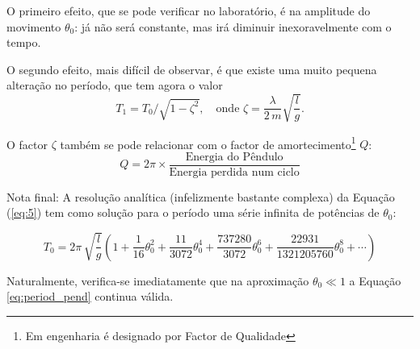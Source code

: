 \documentclass[a4paper,twoside,12pt]{article}      %
\begin{document}
O primeiro efeito, que se pode verificar no laboratório, é na amplitude do movimento $\theta_0$: já não será  constante, mas irá diminuir inexoravelmente com o tempo. 

O segundo efeito,  mais difícil de observar, é que existe uma muito pequena alteração no período, que tem agora o valor
\begin{equation}
T_1= T_0 / \sqrt{1 - \zeta^2}, \quad \text{onde }  \zeta = \frac{\lambda}{2\, m} \sqrt{\frac{l}{g}} .
\end{equation}



O factor  $ \zeta $ também se pode relacionar com o factor de amortecimento\footnote{Em engenharia é designado por Factor de Qualidade} $Q$:
\begin{equation}
Q = 2 \pi \times \frac{\text{Energia do Pêndulo}}{\text{Energia perdida num ciclo}}
\end{equation}

Nota final: 
A resolução analítica (infelizmente bastante complexa) da Equação 	(\ref{eq:5})  tem como solução para o período uma série  infinita de potências de $\theta_0$:

\begin{equation}
	\label{eq:period_pend_exa}
T_0 =  2\pi\, \sqrt{\frac{l}{g}} \left(1 + \frac{1}{16} \theta_0^{2} + \frac{11}{3072} \theta_0^{4} +
 \frac{737280}{3072} \theta_0^{6} + \frac{22931}{1321205760} \theta_0^{8} + \cdots \right)
\end{equation}

Naturalmente, verifica-se imediatamente que na aproximação $\theta_0 \ll 1$ a Equação \ref{eq:period_pend} continua válida.




\end{document}
